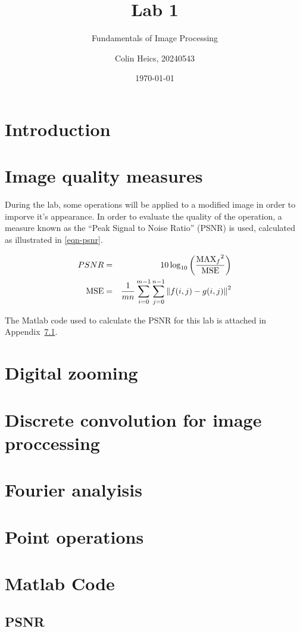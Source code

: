 \documentclass[article, 1.5space, letterpaper, 12pt, oneside, header, footer]{SydeClass}
\title{Lab 1}
\subtitle{Fundamentals of Image Processing}
\author{Colin Heics, 20240543}
\date{\today}
\begin{document}



\section{Introduction}



\section{Image quality measures}

During the lab, some operations will be applied to a modified image in order to imporve it's appearance. In order to evaluate the quality of the operation, a measure known as the ``Peak Signal to Noise Ratio'' (PSNR) is used, calculated as illustrated in \eqref{eqn-psnr}.

\begin{eqnarray}
\label{eqn-psnr}
PSNR & = & 10 \log_{10}\left ( \frac{{\textup{MAX}_f}^{2}}{\textup{MSE}} \right ) \\
\textup{MSE} & = &\frac{1}{mn} \sum_{i=0}^{m-1}\sum_{j=0}^{n-1} \left \| f(i,j) - g(i,j) \right \|^2
\end{eqnarray}

The Matlab code used to calculate the PSNR for this lab is attached in Appendix~\ref{code-PSNR}.


\section{Digital zooming}

\section{Discrete convolution for image proccessing}

\section{Fourier analyisis}

\section{Point operations}

\appendix
\newpage

\section{Matlab Code}
\subsection{PSNR}
\label{code-PSNR}



%
\end{document}
